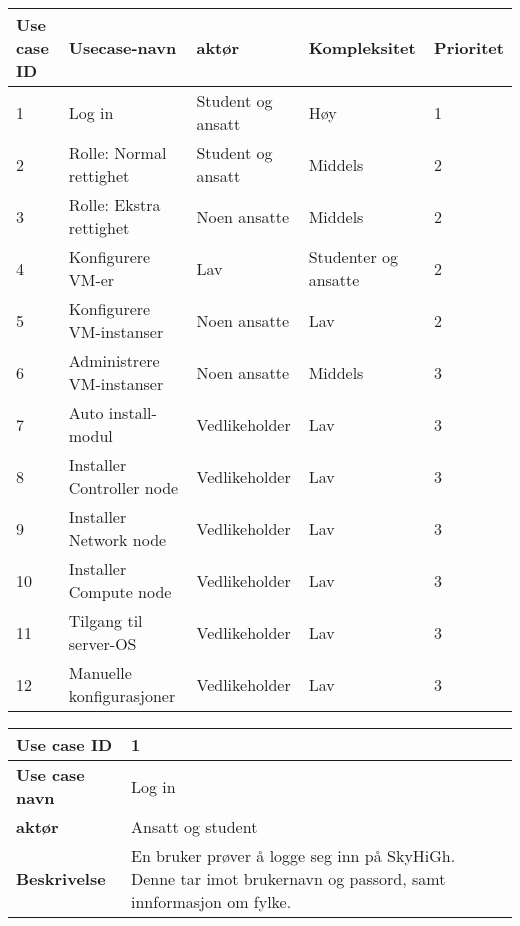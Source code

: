 \begin{table}[H]
	\begin{tabular}[Figur 1]{| p{1cm} | p{3cm} | p{3cm} | p{3cm} | p{2cm} }
		\hline \rowcolor{lightgray} \textbf{Use case ID} & \textbf{Usecase-navn} & \textbf{aktør} & \textbf{Kompleksitet} & \textbf{Prioritet} \\
		\hline \rowcolor{darkgray} 1 & Log in & Student og ansatt & Høy & 1 \\
		\hline \rowcolor{lightgray} 2 & Rolle: Normal rettighet & Student og ansatt & Middels & 2 \\
		\hline \rowcolor{darkgray} 3 & Rolle: Ekstra rettighet & Noen ansatte & Middels & 2 \\
		\hline \rowcolor{lightgray} 4 & Konfigurere VM-er & Lav & Studenter og ansatte & 2 \\
		\hline \rowcolor{darkgray} 5 & Konfigurere VM-instanser & Noen ansatte & Lav & 2 \\
		\hline \rowcolor{lightgray} 6 & Administrere VM-instanser & Noen ansatte & Middels & 3 \\
		\hline \rowcolor{darkgray} 7 & Auto install-modul & Vedlikeholder & Lav & 3 \\
		\hline \rowcolor{lightgray} 8 & Installer Controller node & Vedlikeholder & Lav & 3 \\
		\hline \rowcolor{darkgray} 9 & Installer Network node & Vedlikeholder & Lav & 3 \\
		\hline \rowcolor{lightgray} 10 & Installer Compute node & Vedlikeholder & Lav & 3 \\
		\hline \rowcolor{darkgray} 11 & Tilgang til server-OS & Vedlikeholder & Lav & 3 \\
		\hline \rowcolor{lightgray} 12 & Manuelle konfigurasjoner & Vedlikeholder & Lav & 3 \\
		\hline
	\end{tabular}
\end{table}

\begin{table}[H]
	\begin{tabular}[Figur 2]{| p{2cm} | p{9cm} |}
		\hline \rowcolor{lightgray} \textbf{Use case ID} & 1 \\
		\hline \rowcolor{darkgray} \textbf{Use case navn} & Log in \\
		\hline \rowcolor{lightgray} \textbf{aktør} & Ansatt og student\\
		\hline \rowcolor{darkgray} \textbf{Beskrivelse} & En bruker prøver å logge seg inn på SkyHiGh. Denne tar imot brukernavn og passord, samt innformasjon om fylke. \\
		\hline
	\end{tabular}
\end{table}

